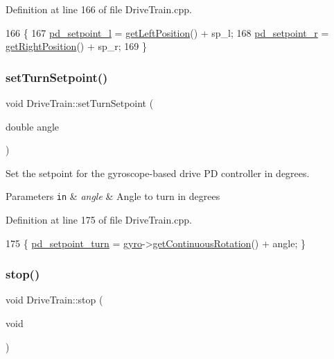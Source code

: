 Definition at line 166 of file Drive\+Train.\+cpp.


\begin{DoxyCode}
166                                                       \{
167     \hyperlink{class_drive_train_a44be549ca050bf41e9b2474a2640200b}{pd\_setpoint\_l} = \hyperlink{class_drive_train_a9ec0f8309cf9670fec618e8b00f70390}{getLeftPosition}() + sp\_l;
168     \hyperlink{class_drive_train_a57e389649151326bf84ab4bd13b6b61c}{pd\_setpoint\_r} = \hyperlink{class_drive_train_aa52a34fcdfad88883c78b81336661137}{getRightPosition}() + sp\_r;
169 \}
\end{DoxyCode}
\mbox{\label{class_drive_train_abaf93133223369df521ba2c8bcfea09d}} 
\subsubsection{\texorpdfstring{set\+Turn\+Setpoint()}{setTurnSetpoint()}}
{\footnotesize\ttfamily void Drive\+Train\+::set\+Turn\+Setpoint (\begin{DoxyParamCaption}\item[{double}]{angle }\end{DoxyParamCaption})}



Set the setpoint for the gyroscope-\/based drive PD controller in degrees. 


\begin{DoxyParams}[1]{Parameters}
\mbox{\tt in}  & {\em angle} & Angle to turn in degrees \\
\hline
\end{DoxyParams}


Definition at line 175 of file Drive\+Train.\+cpp.


\begin{DoxyCode}
175 \{ \hyperlink{class_drive_train_a2a1e6c6c70405144799a329bcfd0a969}{pd\_setpoint\_turn} = \hyperlink{class_drive_train_a7fca76321e3bf08c0bcdc645b9e70b1d}{gyro}->\hyperlink{class_gyroscope_a019f1512ef009051ca2a899759321a9e}{getContinuousRotation}() + angle; \}
\end{DoxyCode}
\mbox{\label{class_drive_train_a18d4c7b82118a1da8910d09a31f88a38}} 
\subsubsection{\texorpdfstring{stop()}{stop()}}
{\footnotesize\ttfamily void Drive\+Train\+::stop (\begin{DoxyParamCaption}\item[{void}]{ }\end{DoxyParamCaption})}



